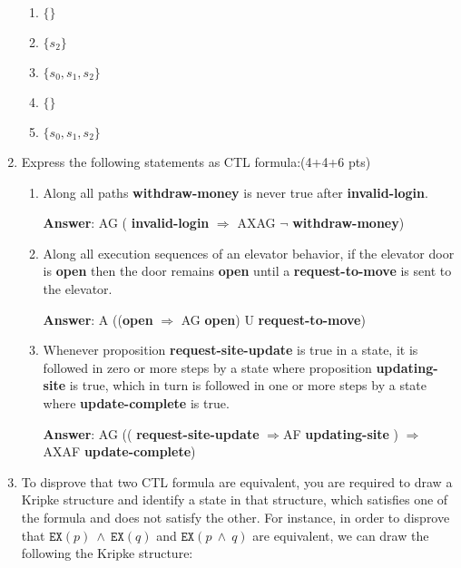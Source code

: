 \documentclass[11pt]{article}
\newcommand{\ex}[1]{\texttt{EX}(#1)}
\begin{document}
\begin{enumerate}
\begin{enumerate}
\item $\{ \}$
  
\item $\{ s_2\}$

\item $\{ s_0, s_1, s_2\}$

\item $\{\}$
  
\item $\{s_0, s_1, s_2\}$
  
\end{enumerate}

\item Express the following statements as CTL formula:\hfill (4+4+6 pts)
\begin{enumerate}

\item
Along all paths \textbf{withdraw-money} is never true after
\textbf{invalid-login}.

\textbf{Answer}: AG (  \textbf{invalid-login} $\Rightarrow$ AXAG $\neg$ \textbf{withdraw-money})

\item
Along all execution sequences of an elevator behavior, if the elevator
door is \textbf{open} then the door remains \textbf{open} until a
\textbf{request-to-move} is sent to the elevator.

\textbf{Answer}: A ((\textbf{open} $\Rightarrow$ AG  \textbf{open}) U \textbf{request-to-move})

\item 
Whenever proposition \textbf{request-site-update} is true in a state,
it is followed in zero or more steps by a state where proposition
\textbf{updating-site} is true, which in turn is followed in one or
more steps by a state where \textbf{update-complete} is true.

\textbf{Answer}: AG (( \textbf{request-site-update} $\Rightarrow $AF \textbf{updating-site} ) $\Rightarrow$ AXAF \textbf{update-complete}) 



\end{enumerate}


\item To disprove that two CTL formula are equivalent, you are
  required to draw a Kripke structure and identify a state in that
  structure, which satisfies one of the formula and does not satisfy
  the other. For instance, in order to disprove that
  $\ex{p}\ \land\ \ex{q}$ and $\ex{p\ \land\ q}$ are equivalent, we can
  draw the following the Kripke structure:


\end{enumerate}
\end{document}
